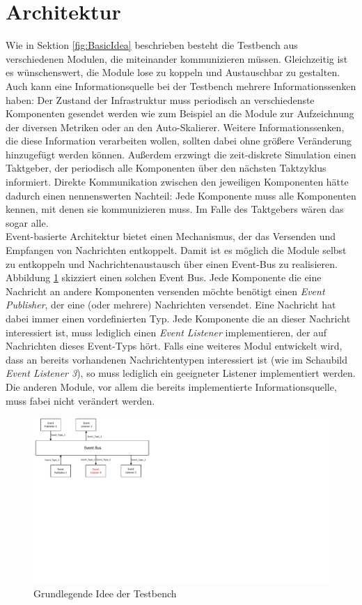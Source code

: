\section{Architektur}
\label{sec:Architektur und Technologien:Architektur}
Wie in Sektion \ref{fig:BasicIdea} beschrieben besteht die Testbench aus verschiedenen Modulen, die miteinander kommunizieren müssen. Gleichzeitig ist es wünschenswert, die Module lose zu koppeln und Austauschbar zu gestalten. Auch kann eine Informationsquelle bei der Testbench mehrere Informationssenken haben: Der Zustand der Infrastruktur muss periodisch an verschiedenste Komponenten gesendet werden wie zum Beispiel an die Module zur Aufzeichnung der diversen Metriken oder an den Auto-Skalierer. Weitere Informationssenken, die diese Information verarbeiten wollen, sollten dabei ohne größere Veränderung hinzugefügt werden können. Außerdem erzwingt die zeit-diskrete Simulation einen Taktgeber, der periodisch alle Komponenten über den nächsten Taktzyklus informiert. Direkte Kommunikation zwischen den jeweiligen Komponenten hätte dadurch einen nennenswerten Nachteil: Jede Komponente muss alle Komponenten kennen, mit denen sie kommunizieren muss. Im Falle des Taktgebers wären das sogar alle. \\
Event-basierte Architektur bietet einen Mechanismus, der das Versenden und Empfangen von Nachrichten entkoppelt. Damit ist es möglich die Module selbst zu entkoppeln und Nachrichtenaustausch über einen Event-Bus zu realisieren. Abbildung \ref{fig:EventBus} skizziert einen solchen Event Bus. Jede Komponente die eine Nachricht an andere Komponenten versenden möchte benötigt einen \textit{Event Publisher}, der eine (oder mehrere) Nachrichten versendet. Eine Nachricht hat dabei immer einen vordefinierten Typ. Jede Komponente die an dieser Nachricht interessiert ist, muss lediglich einen \textit{Event Listener} implementieren, der auf Nachrichten dieses Event-Typs hört. Falls eine weiteres Modul entwickelt wird, dass an bereits vorhandenen Nachrichtentypen interessiert ist (wie im Schaubild \textit{Event Listener 3}), so muss lediglich ein geeigneter Listener implementiert werden. Die anderen Module, vor allem die bereits implementierte Informationsquelle, muss fabei nicht verändert werden.  


\begin{figure}[t]
	\includegraphics[width=\textwidth, trim={0cm 11.5cm 19cm 0cm}]{img/EventBus.pdf}
	\caption{Grundlegende Idee der Testbench}
	\label{fig:EventBus}
\end{figure}
